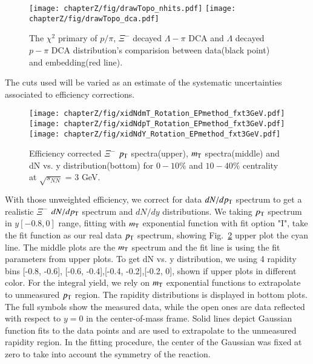 \begin{figure*}[hbt!]
\texttt{[image: chapterZ/fig/drawTopo\_nhits.pdf]}
\texttt{[image: chapterZ/fig/drawTopo\_dca.pdf]}
\caption{The $\chi^2$ primary of $p/\pi$, $\Xi^-$ decayed $\Lambda-\pi$ DCA and $\Lambda$ decayed $p-\pi$ DCA distribution's comparision between data(black point) and embedding(red line).}
\label{fig:emb_check}
\end{figure*}


The cuts used will be varied as an estimate of the systematic uncertainties associated to efficiency corrections.


\begin{figure*}[hbt!]
\texttt{[image: chapterZ/fig/xidNdmT\_Rotation\_EPmethod\_fxt3GeV.pdf]}
\texttt{[image: chapterZ/fig/xidNdpT\_Rotation\_EPmethod\_fxt3GeV.pdf]}
\texttt{[image: chapterZ/fig/xidNdY\_Rotation\_EPmethod\_fxt3GeV.pdf]}
\caption{ Efficiency corrected $\Xi^{-}$ $p_{\rm T}$ spectra(upper), $m_{\rm T}$ spectra(middle) and dN vs. y distribution(bottom) for $0-10\%$ and $10-40\%$ centrality at $\sqrt{s_{NN}}$ = 3 GeV.}
\label{flat_dndpt}
\end{figure*}

With those unweighted efficiency, we correct for data $dN/dp_{\rm T}$ spectrum to get a realistic $\Xi^{-}$ $dN/dp_{\rm T}$ spectrum and $dN/dy$ distributions. We taking $p_{\rm T}$ spectrum in $y[-0.8, 0]$ range, fitting with $m_{\rm T}$ exponential function with fit option "I", take the fit function as our real data $p_{\rm T}$ spectrum, showing Fig.~\ref{flat_dndpt} upper plot the cyan line. The middle plots are the $m_{\rm T}$ spectrum and the fit line is using the fit parameters from upper plots. To get dN vs. y distribution, we using 4 rapidity bins [-0.8, -0.6], [-0.6, -0.4],[-0.4, -0.2],[-0.2, 0], shown if upper plots in different color. For the integral yield, we rely on $m_{\rm T}$ exponential functions to extrapolate to unmeasured $p_{\rm T}$ region. The rapidity distributions is displayed in bottom plots. The full symbols show the measured data, while the open ones are data reflected with respect to $y = 0$ in the center-of-mass frame. Solid lines depict Gaussian function fits to the data points and are used to extrapolate to the unmeasured rapidity region. In the fitting procedure, the center of the Gaussian was fixed at zero to take into account the symmetry of the reaction. 


